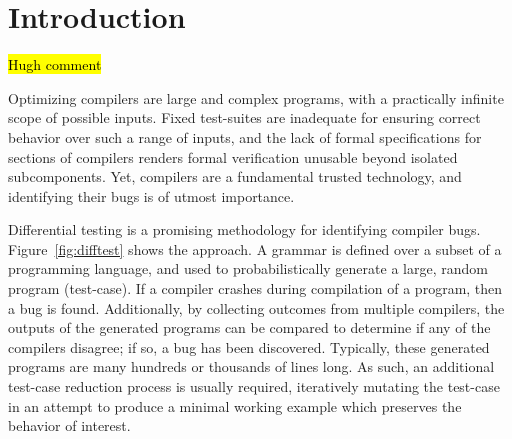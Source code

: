 \section{Introduction}\label{sec:intro}

\hl{Hugh comment}

\noindent
Optimizing compilers are large and complex programs, with a practically infinite scope of possible inputs. Fixed test-suites are inadequate for ensuring correct behavior over such a range of inputs, and the lack of formal specifications for sections of compilers renders formal verification unusable beyond isolated subcomponents. Yet, compilers are a fundamental trusted technology, and identifying their bugs is of utmost importance. %


Differential testing is a promising methodology for identifying compiler bugs. Figure~\ref{fig:difftest} shows the approach. A grammar is defined over a subset of a programming language, and used to probabilistically generate a large, random program (test-case).  If a compiler crashes during compilation of a program, then a bug is found. Additionally, by collecting outcomes from multiple compilers, the outputs of the generated programs can be compared to determine if any of the compilers disagree; if so, a bug has been discovered. Typically, these generated programs are many hundreds or thousands of lines long. As such, an additional test-case reduction process is usually required, iteratively mutating the test-case in an attempt to produce a minimal working example which preserves the behavior of interest.

